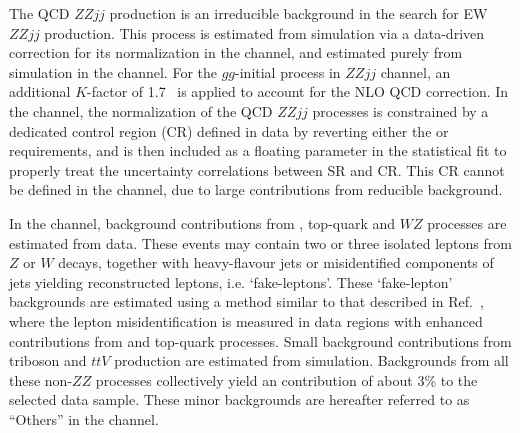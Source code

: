 The QCD $ZZjj$ production is an irreducible background in the search for EW $ZZjj$ production.
This process is estimated from simulation via a data-driven correction for its normalization in the \lllljj channel, and estimated purely from simulation in the \llvvjj channel.
For the $gg$-initial process in $ZZjj$ channel, an additional $K$-factor of 1.7~\cite{PhysRevD.92.094028} is applied to account for the NLO QCD correction.
In the \lllljj channel, the normalization of the QCD $ZZjj$ processes is constrained by a dedicated control region (CR) defined in data by reverting either the \mjj or \dyjj requirements,
and is then included as a floating parameter in the statistical fit to properly treat the uncertainty correlations between SR and CR.
This CR cannot be defined in the \llvvjj channel, due to large contributions from reducible background.

In the \lllljj channel, background contributions from \Zjet, top-quark and $WZ$ processes are estimated from data.
These events may contain two or three isolated leptons from $Z$ or $W$ decays, together with heavy-flavour jets or misidentified components of jets yielding reconstructed leptons, i.e. `fake-leptons'.
These `fake-lepton' backgrounds are estimated using a method similar to that described in Ref.~\cite{Aaboud:2017rwm},
where the lepton misidentification is measured in data regions with enhanced contributions from \Zjet and top-quark processes.
Small background contributions from triboson and $ttV$ production are estimated from simulation.
Backgrounds from all these non-$ZZ$ processes collectively yield an contribution of about 3\% to the selected data sample. These minor backgrounds are hereafter referred to as ``Others'' in the \lllljj channel.

